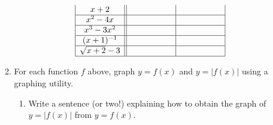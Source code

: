 \begin{enumerate}
\begin{enumerate}
\[\begin{array}{|c||c|c|}
x+2 &      \hphantom{\sqrt{x+3}-2}   &         \hphantom{\sqrt{x+3}-2}      \\ \hline

x^2-4x &      \hphantom{\sqrt{x+3}-2}      &      \hphantom{\sqrt{x+3}-2}       \\  \hline

x^3-3x^2 &     \hphantom{\sqrt{x+3}-2}       &    \hphantom{\sqrt{x+3}-2}       \\  \hline  

(x+1)^{-1}  &      \hphantom{\sqrt{x+3}-2}      &    \hphantom{\sqrt{x+3}-2}       \\  \hline   

\sqrt{x+2}-3&    \hphantom{\sqrt{x+3}-2}        &     \hphantom{\sqrt{x+3}-2}      \\  \hline   

 \end{array} \]
 











\item For each function $f$ above, graph $y = f(x)$ and $y=|f(x)|$ using a graphing utility.

\begin{enumerate}

\item Write a sentence (or two!) explaining how to obtain the graph of $y=|f(x)|$ from $y = f(x)$.  


\end{enumerate}
\end{enumerate}
\end{enumerate}
